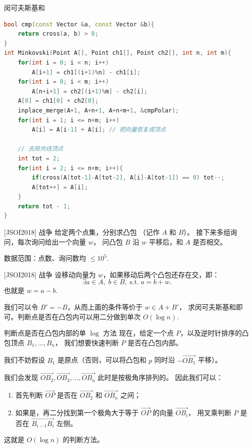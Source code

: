 \documentclass{beamer}
\begin{document}
\begin{frame}[fragile]{闵可夫斯基和}
    \footnotesize
    \begin{lstlisting}[language=c++]
bool cmp(const Vector &a, const Vector &b){
    return cross(a, b) > 0;
}
int Minkovski(Point A[], Point ch1[], Point ch2[], int n, int m){
    for(int i = 0; i < n; i++)
        A[i+1] = ch1[(i+1)%n] - ch1[i];
    for(int i = 0; i < m; i++)
        A[n+i+1] = ch2[(i+1)%m] - ch2[i];
    A[0] = ch1[0] + ch2[0];
    inplace_merge(A+1, A+n+1, A+n+m+1, &cmpPolar);
    for(int i = 1; i <= n+m; i++)
        A[i] = A[i-1] + A[i]; // 把向量恢复成顶点

    // 去除共线顶点
    int tot = 2;
    for(int i = 2; i <= n+m; i++){
        if(cross(A[tot-1]-A[tot-2], A[i]-A[tot-1]) == 0) tot--;
        A[tot++] = A[i];
    }
    return tot - 1;
}
    \end{lstlisting}
\end{frame}

\begin{frame}{[JSOI2018] 战争}
    \small
    给定两个点集，分别求凸包 （记作 $A$ 和 $B$）。
    接下来多组询问，每次询问给出一个向量 $w$，
    问凸包 $B$ 沿 $w$ 平移后，和 $A$ 是否相交。
    \vspace{1em}

    数据范围：点数、询问数均 $\leq 10^5$.
\end{frame}

\begin{frame}{[JSOI2018] 战争}
    \small
    设移动向量为 $w$，如果移动后两个凸包还存在交，即：
    \begin{equation*}
        \exists a\in A,\; b\in B,\; \text{s.t.}\; a=b+w.
    \end{equation*}
    也就是 $w=a-b$.

    \vspace{1em}\pause
    我们可以令 $B'=-B$，从而上面的条件等价于 $w\in A+B'$，
    求闵可夫斯基和即可。判断点是否在凸包内可以用二分做到单次 $O(\log n)$.
\end{frame}

\begin{frame}{判断点是否在凸包内部的单 $\log$ 方法}
    \small
    现在，给定一个点 $P$，以及逆时针排序的凸包顶点 $B_1,...,B_n$，
    我们想要快速判断 $P$ 是否在凸包内部。

    \vspace{1em}
    我们不妨假设 $B_1$ 是原点（否则，可以将凸包和 $p$ 同时沿 $-\overrightarrow{OB_1}$ 平移）。

    \vspace{1em}\pause
    我们会发现 $\overrightarrow{OB_2},\overrightarrow{OB_3},...,\overrightarrow{OB_n}$ 此时是按极角序排列的。
    因此我们可以：
    \begin{enumerate}
        \item 首先判断 $\overrightarrow{OP}$ 是否在 $\overrightarrow{OB_2}$ 和 $\overrightarrow{OB_n}$ 之间；
        \item 如果是，再二分找到第一个极角大于等于 $\overrightarrow{OP}$ 的向量 $\overrightarrow{OB_i}$，
        用叉乘判断 $P$ 是否在 $\overrightarrow{B_{i-1}B_i}$ 左侧。 
    \end{enumerate}
    这就是 $O(\log n)$ 的判断方法。
\end{frame}
\end{document}
